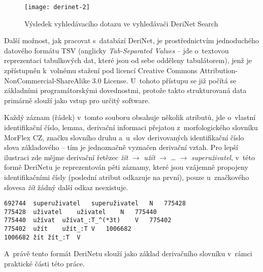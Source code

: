 \begin{figure}[ht]   
    \centering
    \texttt{[image: derinet-2]}  
    \caption{Výsledek vyhledávacího dotazu ve vyhledávači DeriNet Search~\parencite{derinet}}
    \label{derinet-2}
 \end{figure}

Další možnost, jak pracovat s~databází DeriNet, je prostřednictvím
jednoduchého datového formátu TSV (anglicky \emph{Tab-Separated Values}
-- jde o~textovou reprezentaci tabulkových dat, které jsou od sebe
odděleny tabulátorem), jenž je zpřístupněn k~volnému stažení pod licencí
Creative Commons Attribution-NonCommercial-ShareAlike 3.0 License.
U~tohoto přístupu se již počítá se základními programátorskými
dovednostmi, protože takto strukturovaná data primárně slouží jako vstup
pro určitý software.~\parencite{derinet-cz}

Každý záznam (řádek) v~tomto souboru obsahuje několik atributů, jde
o~vlastní identifikační číslo, lemma, derivační informaci přejatou
z~morfologického slovníku MorFlex CZ, značku slovního druhu a~u~slov
derivovaných identifikační číslo slova základového -- tím je jednoznačně
vyznačen derivační vztah. Pro lepší ilustraci zde mějme derivační
řetězec \emph{žít} $\rightarrow$ \emph{užít} $\rightarrow$
\ldots{} $\rightarrow$ \emph{superuživatel}, v~této formě DeriNetu je
reprezentován pěti záznamy, které jsou vzájemně propojeny
identifikačními čísly (poslední atribut odkazuje na první), pouze
u~značkového slovesa \emph{žít} žádný další odkaz neexistuje.
\parencite{derinet}

\begin{verbatim}
692744  superuživatel   superuživatel   N   775428
775428  uživatel    uživatel    N   775440
775440  užívat  užívat_:T_^(*3t)    V   775402
775402  užít    užít_:T V   1006682
1006682 žít žít_:T  V
\end{verbatim}

A~právě tento formát DeriNetu slouží jako základ derivačního slovníku
v~rámci praktické části této práce.

